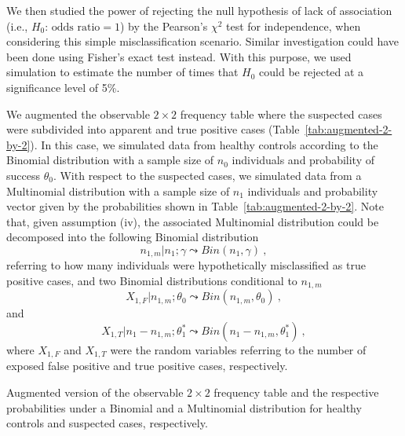 We then studied the power of rejecting the null hypothesis of lack of association (i.e., $H_0\text{: odds ratio} = 1$) by the Pearson's $\chi^2$ test for independence, when considering this simple misclassification scenario. Similar investigation could have been done using Fisher's exact test instead. With this purpose, we used simulation to estimate the number of times that $H_0$ could be rejected at a significance level of 5\%. 

We augmented the observable $2\times 2$ frequency table where the suspected cases were subdivided into apparent and true positive cases (Table~\ref{tab:augmented-2-by-2}). In this case, we simulated data from healthy controls according to the Binomial distribution with a sample size of $n_0$ individuals and probability of success $\theta_0$. With respect to the suspected cases, we simulated data from a Multinomial distribution with a sample size of $n_1$ individuals and probability vector given by the probabilities shown in Table~\ref{tab:augmented-2-by-2}. Note that, given assumption (iv), the associated Multinomial  distribution could be decomposed into the following Binomial distribution
% 
\begin{equation}
    n_{1,m} | n_1; \gamma \leadsto Bin (n_1, \gamma) \ ,
\end{equation}
% 
referring to how many individuals were hypothetically misclassified as true positive cases, and two Binomial distributions conditional to $n_{1,m}$
% 
\begin{equation}
    X_{1,F} | n_{1,m}; \theta_0 \leadsto Bin (n_{1,m}, \theta_0) \ ,
\end{equation}
% 
and 
% 
\begin{equation}
    X_{1,T} | n_1-n_{1,m}; \theta^*_1 \leadsto Bin (n_1-n_{1,m}, \theta^*_1) \ ,
\end{equation}
% 
where $X_{1,F}$ and $X_{1,T}$ were the random variables referring to the number of exposed false positive and true positive cases, respectively.

\begin{table}[h]
    \centering
    \caption[Augmented version of the observable $2 \times 2$ frequency table and probabilities for healthy controls and suspected cases]{Augmented version of the observable $2 \times 2$ frequency table and the respective probabilities under a Binomial and a Multinomial distribution for healthy controls and suspected cases, respectively.}
    
    \label{tab:augmented-2-by-2}
\end{table}

